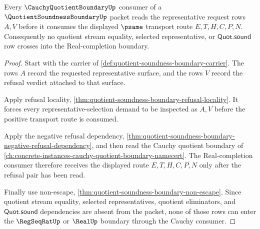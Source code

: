 \begin{theorem}
\label{thm:quotient-soundness-boundary-cauchy-refusal-link}
Every $\CauchyQuotientBoundaryUp$ consumer of a $\QuotientSoundnessBoundaryUp$ packet reads the representative request rows $A,V$ before it consumes the displayed $\psame$ transport route $E,T,H,C,P,N$. Consequently no quotient stream equality, selected representative, or $\mathsf{Quot.sound}$ row crosses into the Real-completion boundary.
\end{theorem}
\begin{proof}
Start with the carrier of \autoref{def:quotient-soundness-boundary-carrier}. The rows $A$ record the requested representative surface, and the rows $V$ record the refusal verdict attached to that surface.

Apply refusal locality, \autoref{thm:quotient-soundness-boundary-refusal-locality}. It forces every representative-selection demand to be inspected as $A,V$ before the positive transport route is consumed.

Apply the negative refusal dependency, \autoref{thm:quotient-soundness-boundary-negative-refusal-dependency}, and then read the Cauchy quotient boundary of \autoref{ch:concrete-instances-cauchy-quotient-boundary-namecert}. The Real-completion consumer therefore receives the displayed route $E,T,H,C,P,N$ only after the refusal pair has been read.

Finally use non-escape, \autoref{thm:quotient-soundness-boundary-non-escape}. Since quotient stream equality, selected representatives, quotient eliminators, and $\mathsf{Quot.sound}$ dependencies are absent from the packet, none of those rows can enter the $\RegSeqRatUp$ or $\RealUp$ boundary through the Cauchy consumer.
\end{proof}

